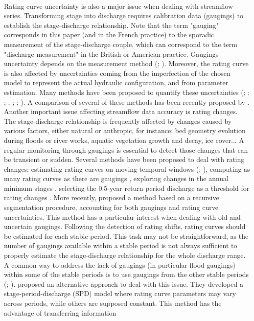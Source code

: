     \paragraph{}
    Rating curve uncertainty is also a major issue when dealing with streamflow series. Transforming stage into discharge requires calibration data (gaugings) to establish the stage-discharge relationship. Note that the term "gauging" corresponds in this paper (and in the French practice) to the sporadic measurement of the stage-discharge couple, which can correspond to the term "discharge measurement" in the British or American practice. Gaugings uncertainty depends on the measurement method (\citet{lecoz_quantification_2014}; \citet{puechberty_charte_2017}). Moreover, the rating curve is also affected by uncertainties coming from the imperfection of the chosen model to represent the actual hydraulic configuration, and from parameter estimation. Many methods have been proposed to quantify these uncertainties (\citet{petersen-overleir_bayesian_2009}; \citet{juston_rating_2014}; \citet{le_coz_combining_2014}; \citet{morlot_dynamic_2014}; \citet{coxon_novel_2015}; \citet{mcmillan_rating_2015}; \citet{mansanarez_rapid_2019}). A comparison of several of these methods has been recently proposed by \citet{kiang_comparison_2018}. Another important issue affecting streamflow data accuracy is rating changes. The stage-discharge relationship is frequently affected by changes caused by various factors, either natural or anthropic, for instance: bed geometry evolution during floods or river works, aquatic vegetation growth and decay, ice cover... A regular monitoring through gaugings is essential to detect those changes \citep{ibbitt_gauging_1987} that can be transient or sudden. Several methods have been proposed to deal with rating changes: estimating rating curves on moving temporal windows (\citet{westerberg_stage-discharge_2011}; \citet{guerrero_temporal_2012}), computing as many rating curves as there are gaugings \citep{morlot_dynamic_2014}, exploring changes in the annual minimum stages \citep{lapuszek_methods_2015}, selecting the 0.5-year return period discharge as a threshold for rating changes \citep{mcmillan_impacts_2010}. More recently, \citet{darienzo_detection_2021} proposed a method based on a recursive segmentation procedure, accounting for both gaugings and rating curve uncertainties. This method has a particular interest when dealing with old and uncertain gaugings. Following the detection of rating shifts, rating curves should be estimated for each stable period. This task may not be straightforward, as the number of gaugings available within a stable period is not always sufficient to properly estimate the stage-discharge relationship for the whole discharge range. A common way to address the lack of gaugings (in particular flood gaugings) within some of the stable periods is to use gaugings from the other stable periods (\cite{mcmillan_benchmarking_2012}; \cite{puechberty_charte_2017}). \citet{mansanarez_shift_2019} proposed an alternative approach to deal with this issue. They developed a stage-period-discharge (SPD) model where rating curve parameters may vary across periods, while others are supposed constant. This method has the advantage of transferring information 